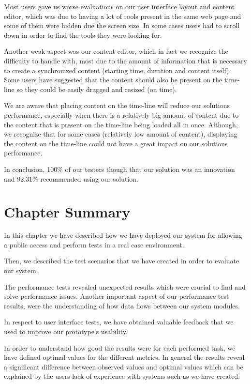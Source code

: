 Most users gave us worse evaluations on our user interface layout and content editor, which was due to having a lot of tools present in the same web page and some of them were hidden due the screen size. In some cases users had to scroll down in order to find the tools they were looking for. 

Another weak aspect was our content editor, which in fact we recognize the difficulty to handle with, most due to the amount of information that is necessary to create a synchronized content (starting time, duration and content itself). Some users have suggested that the content should also be present on the time-line so they could be easily dragged and resized (on time).

We are aware that placing content on the time-line will reduce our solutions performance, especially when there is a relatively big amount of content due to the content that is present on the time-line being loaded all in once. Although, we recognize that for some cases (relatively low amount of content), displaying the content on the time-line could not have a great impact on our solutions performance. 

In conclusion, 100\% of our testers though that our solution was an innovation and 92.31\% recommended using our solution.


\section{Chapter Summary}
\label{evaluation:summary}

In this chapter we have described how we have deployed our system for allowing a public access and perform tests in a real case environment.
 
Then, we described the test scenarios that we have created in order to evaluate our system. 

The performance tests revealed unexpected results which were crucial to find and solve performance issues. Another important aspect of our performance test results, were the understanding of how data flows between our system modules.

In respect to user interface tests, we have obtained valuable feedback that we used to improve our prototype's usability. 

In order to understand how good the results were for each performed task, we have defined optimal values for the different metrics. In general the results reveal a significant difference between observed values and optimal values which can be explained by the users lack of experience with systems such as we have created.